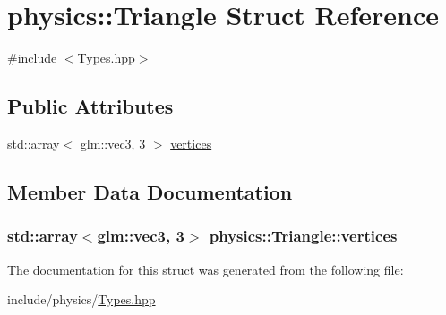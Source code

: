 \hypertarget{structphysics_1_1Triangle}{\section{physics\-:\-:Triangle Struct Reference}
\label{structphysics_1_1Triangle}
}


{\ttfamily \#include $<$Types.\-hpp$>$}

\subsection*{Public Attributes}
\begin{DoxyCompactItemize}
\item 
std\-::array$<$ glm\-::vec3, 3 $>$ \hyperlink{structphysics_1_1Triangle_a9a867c758ba493a00525ae9951b98b0e}{vertices}
\end{DoxyCompactItemize}


\subsection{Member Data Documentation}
\hypertarget{structphysics_1_1Triangle_a9a867c758ba493a00525ae9951b98b0e}{
\subsubsection[{vertices}]{\setlength{\rightskip}{0pt plus 5cm}std\-::array$<$glm\-::vec3, 3$>$ physics\-::\-Triangle\-::vertices}}\label{structphysics_1_1Triangle_a9a867c758ba493a00525ae9951b98b0e}


The documentation for this struct was generated from the following file\-:\begin{DoxyCompactItemize}
\item 
include/physics/\hyperlink{Types_8hpp}{Types.\-hpp}\end{DoxyCompactItemize}
